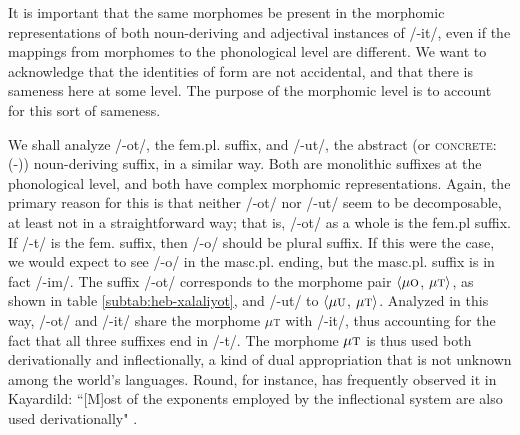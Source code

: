   It is important that the same morphomes be present in the morphomic 
  representations of both noun-deriving and adjectival instances of /-it/, 
  even if the mappings from morphomes to the phonological level are different. We 
  want to acknowledge that the identities of form are not accidental, 
  and that there is sameness here at some level. The purpose of the 
  morphomic level is to account for
  this sort of sameness.
  
 We shall analyze /-ot/, the fem.pl. suffix, and /-ut/, the abstract (or \textsc{concrete:}(-))
 noun-deriving suffix, in a similar way. Both are monolithic suffixes at the phonological
 level, and both have complex morphomic representations. Again, the primary reason for this
 is that neither /-ot/ nor /-ut/ seem to be decomposable, at least not in a straightforward
 way; that is, /-ot/ as a whole is the fem.pl suffix. If /-t/ is the fem. suffix, then
 /-o/ should be plural suffix. If this were the case, we would expect to see
 /-o/ in the masc.pl. ending, but the masc.pl. suffix is in fact /-im/. The suffix /-ot/
 corresponds to the morphome pair $\langle \mu\textsc{o}$, $\mu\textsc{t} \rangle$, 
 as shown in table \ref{subtab:heb-xalaliyot}, and /-ut/
 to $\langle \mu\textsc{u}$, $\mu\textsc{t} \rangle$. 
 Analyzed in this way, /-ot/ and /-it/ share the morphome $\mu$\textsc{t} with /-it/, thus accounting
 for the fact that all three suffixes end in /-t/. The morphome $\mu\textsc{t}$ is thus
 used both derivationally and inflectionally, a kind of dual appropriation that is not unknown among
 the world's languages. Round, for instance, has frequently observed it in Kayardild:
 ``[M]ost of the exponents employed by the inflectional system are also used 
 derivationally" \citep[][p. 13]{round:2015}.
  



